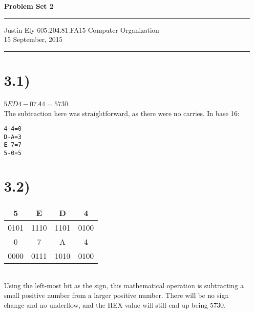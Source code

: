 \documentclass[a4paper,11pt]{article}
\begin{document}
\begin{flushright}

\vspace{1.1cm}

{\bf\Huge Problem Set 2}

\rule{0.25\linewidth}{0.5pt}

\vspace{0.5cm}
Justin Ely
\linebreak
\newline
\footnotesize{605.204.81.FA15 Computer Organization\\}
\vspace{0.5cm}
15 September, 2015
\end{flushright}

\noindent\rule{\linewidth}{1.0pt}



\section*{3.1)}
$5ED4 - 07A4 = 5730$.  \\
The subtraction here was straightforward, as there were no carries.  In base 16:
\begin{verbatim}
4-4=0
D-A=3
E-7=7
5-0=5
\end{verbatim}


\section*{3.2)} 

\begin{tabular}{| c | c | c | c | }
  \hline			
  5 & E & D & 4  \\
  \hline
  0101 & 1110 & 1101 & 0100  \\
  \hline  
   \hline			
  0 & 7 & A & 4  \\
  \hline
  0000 & 0111 & 1010 & 0100  \\
  \hline  
\end{tabular} \\

Using the left-most bit as the sign, this mathematical operation is subtracting a small positive number from a larger positive number.  There will be no sign change and no underflow, and the HEX value will still end up being 5730.
\end{document}
